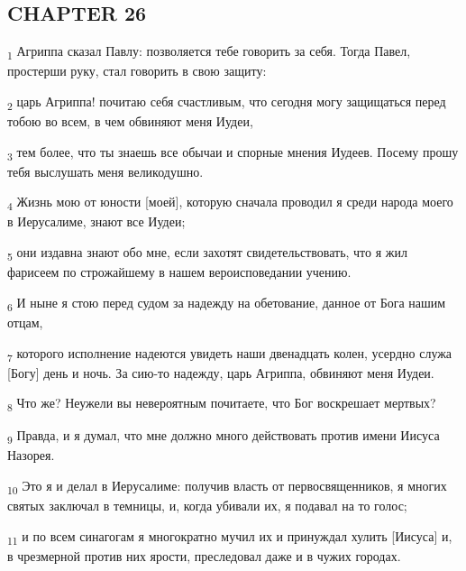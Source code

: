 \subsection{CHAPTER 26}
\begin{tcolorbox}
\textsubscript{1} Агриппа сказал Павлу: позволяется тебе говорить за себя. Тогда Павел, простерши руку, стал говорить в свою защиту:
\end{tcolorbox}
\begin{tcolorbox}
\textsubscript{2} царь Агриппа! почитаю себя счастливым, что сегодня могу защищаться перед тобою во всем, в чем обвиняют меня Иудеи,
\end{tcolorbox}
\begin{tcolorbox}
\textsubscript{3} тем более, что ты знаешь все обычаи и спорные мнения Иудеев. Посему прошу тебя выслушать меня великодушно.
\end{tcolorbox}
\begin{tcolorbox}
\textsubscript{4} Жизнь мою от юности [моей], которую сначала проводил я среди народа моего в Иерусалиме, знают все Иудеи;
\end{tcolorbox}
\begin{tcolorbox}
\textsubscript{5} они издавна знают обо мне, если захотят свидетельствовать, что я жил фарисеем по строжайшему в нашем вероисповедании учению.
\end{tcolorbox}
\begin{tcolorbox}
\textsubscript{6} И ныне я стою перед судом за надежду на обетование, данное от Бога нашим отцам,
\end{tcolorbox}
\begin{tcolorbox}
\textsubscript{7} которого исполнение надеются увидеть наши двенадцать колен, усердно служа [Богу] день и ночь. За сию-то надежду, царь Агриппа, обвиняют меня Иудеи.
\end{tcolorbox}
\begin{tcolorbox}
\textsubscript{8} Что же? Неужели вы невероятным почитаете, что Бог воскрешает мертвых?
\end{tcolorbox}
\begin{tcolorbox}
\textsubscript{9} Правда, и я думал, что мне должно много действовать против имени Иисуса Назорея.
\end{tcolorbox}
\begin{tcolorbox}
\textsubscript{10} Это я и делал в Иерусалиме: получив власть от первосвященников, я многих святых заключал в темницы, и, когда убивали их, я подавал на то голос;
\end{tcolorbox}
\begin{tcolorbox}
\textsubscript{11} и по всем синагогам я многократно мучил их и принуждал хулить [Иисуса] и, в чрезмерной против них ярости, преследовал даже и в чужих городах.
\end{tcolorbox}
